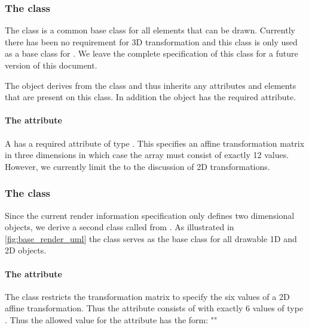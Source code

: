 \subsubsection{The  class}
\label{transformation-class}

The \Transformation class is a common base class for all elements that can be drawn.
Currently there has been no requirement for 3D transformation and this class is only used as a base class for \TransformationTwoD. We leave the complete specification of this class for a future version of this document.


The \Transformation object derives from the \SBase class and thus
inherits any attributes and elements that are present on this class.
In addition the \Transformation object has the required  attribute.

\paragraph{The \fixttspace{} attribute}

A \Transformation has a required attribute  of type \doubleArray. This specifies an affine transformation matrix in three dimensions in which case the array must consist of exactly 12 values. However, we currently limit the \RenderPackage to the discussion of 2D transformations.

\subsubsection{The  class}
\label{transformationtwod-class}

Since the current render information specification only defines two dimensional objects, we derive a second class called \TransformationTwoD from \Transformation. As illustrated in \ref{fig:base_render_uml} the class \TransformationTwoD serves as the base class for all drawable 1D and 2D objects.

\paragraph{The \fixttspace{} attribute}

The \TransformationTwoD class restricts the transformation matrix to specify the six values of a 2D affine transformation. Thus the  attribute consists of \doubleArray with exactly 6 values of type . Thus the allowed 
value for the attribute has the form: ""

